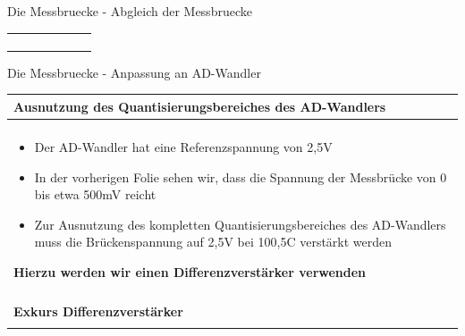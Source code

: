 \begin{frame}[t]{Die Messbruecke - Abgleich der Messbruecke}
\begin{spacing}{0.9}
\begin{tiny}
\begin{table}[h!]
\begin{tabular}{p{10cm} }
\begin{minipage}{\textwidth}
\begin{figure}
                        \end{figure}
                    \end{minipage}
                    \\
                \end{tabular}

            \end{table}

        \end{tiny} \end{spacing}

\end{frame}

\begin{frame}[t]{Die Messbruecke - Anpassung an AD-Wandler}

    \begin{spacing}{0.9} \begin{tiny}
            \begin{table}[h!]
                \begin{tabular}{p{10cm} }
                    \hline
                    \textbf{Ausnutzung des Quantisierungsbereiches des AD-Wandlers} \\
                    \hline                                                          \\
                    \begin{minipage}{\textwidth}
                        \begin{itemize}
                            \item Der AD-Wandler hat eine Referenzspannung von 2,5V
                            \item In der vorherigen Folie sehen wir, dass die Spannung der Messbrücke von 0 bis etwa 500mV reicht
                            \item Zur Ausnutzung des kompletten Quantisierungsbereiches des AD-Wandlers muss die Brückenspannung auf 2,5V bei 100,5C verstärkt werden
                        \end{itemize}
                        \textbf{Hierzu werden wir einen Differenzverstärker verwenden}
                    \end{minipage}
                    \\  \\
                    \hline
                    \textbf{Exkurs Differenzverstärker}                             \\
                    \hline                                                          \\

\end{tabular}
\end{table}
\end{tiny}
\end{spacing}
\end{frame}
